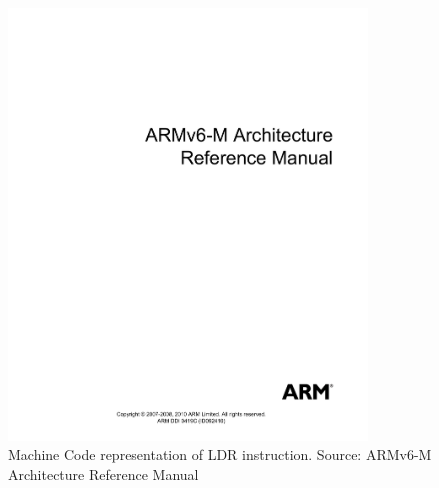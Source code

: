 \begin{figure}
\centering
\includegraphics[page=139, clip=true, trim=35mm 157mm 55mm 40mm, width=0.85\textwidth]{./DDI0419C_arm_architecture_v6m_reference_manual}
\caption{Machine Code representation of LDR instruction. Source: ARMv6-M Architecture Reference Manual}
\label{fig:ldr}
\end{figure}

